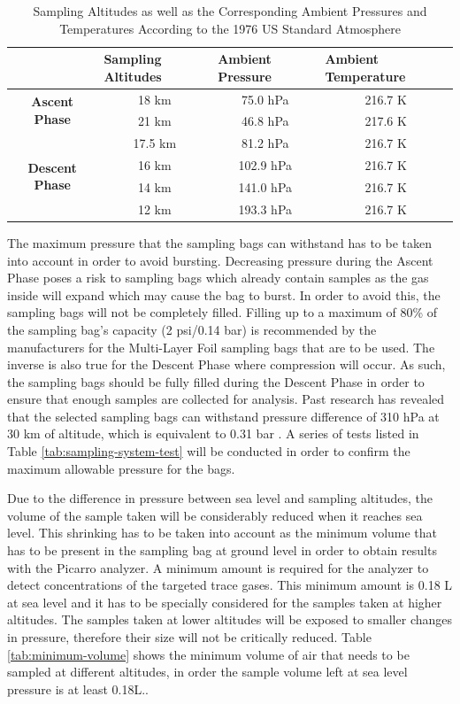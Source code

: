 \documentclass[a4paper,12pt,twoside]{article}
\providecommand{\DIFaddtex}[1]{{\protect\color{blue}\uwave{#1}}} %
\providecommand{\DIFaddFL}[1]{\DIFadd{#1}} %
\providecommand{\DIFaddbeginFL}{} %
\providecommand{\DIFaddendFL}{} %
\providecommand{\DIFadd}[1]{\texorpdfstring{\DIFaddtex{#1}}{#1}} %
\newcommand{\DIFaddincludegraphics}[2][]{{\color{blue}\fbox{\DIFOincludegraphics[#1]{#2}}}} %
\DeclareRobustCommand{\DIFaddbeginFL}{\DIFOaddbeginFL \let\includegraphics\DIFaddincludegraphics} %
\DeclareRobustCommand{\DIFaddendFL}{\DIFOaddendFL \let\includegraphics\DIFOincludegraphics} %
\begin{document}
\begin{table}[H]
\centering
\begin{tabular}{|c|c|c|c|}
\hline
\multicolumn{1}{|l|}{} & \multicolumn{1}{l|}{\textbf{Sampling Altitudes}} & \multicolumn{1}{l|}{\textbf{Ambient Pressure}} & \multicolumn{1}{l|}{\textbf{Ambient Temperature}} \\ \hline
\multirow{2}{*}{\textbf{Ascent Phase}} & 18 km & 75.0 hPa & 216.7 K \\ \cline{2-4} 
 & 21 km & 46.8 hPa & 217.6 K \\ \hline
\multirow{4}{*}{\textbf{Descent Phase}} & 17.5 km & 81.2 hPa & 216.7 K \\ \cline{2-4} 
 & 16 km & 102.9 hPa & 216.7 K \\ \cline{2-4} 
 & 14 km & 141.0 hPa & 216.7 K \\ \cline{2-4} 
 & 12 km & 193.3 hPa & 216.7 K \\ \hline
\end{tabular}
\caption{Sampling Altitudes as well as the Corresponding Ambient Pressures and Temperatures According to the 1976 US Standard Atmosphere\DIFaddbeginFL \DIFaddFL{.}\DIFaddendFL }
\label{tab:sampling-altitudes}
\end{table}

The maximum pressure that the sampling bags can withstand has to be taken into account in order to avoid bursting. Decreasing pressure during the Ascent Phase poses a risk to sampling bags which already contain samples as the gas inside will expand which may cause the bag to burst. In order to avoid this, the sampling bags will not be completely filled. Filling up to a maximum of 80\% of the sampling bag's capacity (2 psi/0.14 bar) is recommended by the manufacturers for the Multi-Layer Foil sampling bags that are to be used. The inverse is also true for the Descent Phase where compression will occur. As such, the sampling bags should be fully filled during the Descent Phase in order to ensure that enough samples are collected for analysis. Past research has revealed that the selected sampling bags can withstand pressure difference of 310 hPa at 30 km of altitude, which is equivalent to 0.31 bar \cite{LISA}. A series of tests listed in Table \ref{tab:sampling-system-test} will be conducted in order to confirm the maximum allowable pressure for the bags.


Due to the difference in pressure between sea level and sampling altitudes, the volume of the sample taken will be considerably reduced when it reaches sea level. This shrinking has to be taken into account as the minimum volume that has to be present in the sampling bag at ground level in order to obtain results with the Picarro analyzer. A minimum amount is required for the analyzer to detect concentrations of the targeted trace gases. This minimum amount is 0.18 L at sea level and it has to be specially considered for the samples taken at higher altitudes. The samples taken at lower altitudes will be exposed to smaller changes in pressure, therefore their size will not be critically reduced. Table \ref{tab:minimum-volume} shows the minimum volume of air that needs to be sampled at different altitudes, in order the sample volume left at sea level pressure is at least 0.18L..  
\end{document}
